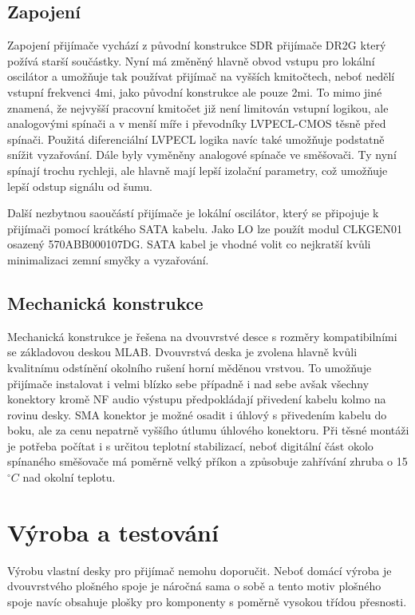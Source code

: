 \documentclass[12pt,a4paper,oneside]{article}
\begin{document}
\subsection{Zapojení}
Zapojení přijímače vychází z původní konstrukce SDR přijímače DR2G \cite{DR2G}  který požívá starší součástky. Nyní má změněný hlavně obvod vstupu pro lokální oscilátor a umožňuje tak používat přijímač na vyšších kmitočtech, neboť nedělí vstupní frekvenci 4mi, jako původní konstrukce ale pouze 2mi. To mimo jiné znamená, že nejvyšší pracovní kmitočet již není limitován vstupní logikou, ale analogovými spínači a v menší míře i převodníky LVPECL-CMOS těsně před spínači. Použitá diferenciální LVPECL logika navíc také umožňuje podstatně snížit vyzařování. Dále byly vyměněny analogové spínače ve směšovači. Ty nyní spínají trochu rychleji, ale hlavně mají lepší izolační parametry, což umožňuje lepší odstup signálu od šumu.


Další nezbytnou saoučástí přijímače je lokální oscilátor, který se připojuje k přijímači pomocí krátkého SATA kabelu. Jako LO lze použít modul CLKGEN01 osazený 570ABB000107DG. SATA kabel je vhodné volit co nejkratší kvůli minimalizaci zemní smyčky a vyzařování. 

\subsection{Mechanická konstrukce}

Mechanická konstrukce je řešena na dvouvrstvé desce s rozměry kompatibilními se základovou deskou MLAB. Dvouvrstvá deska je zvolena hlavně kvůli kvalitnímu odstínění okolního rušení horní měděnou vrstvou. To umožňuje přijímače instalovat i velmi blízko sebe případně i nad sebe avšak všechny konektory  kromě NF audio výstupu předpokládají přivedení kabelu kolmo na rovinu desky. SMA konektor je možné osadit i úhlový s přivedením kabelu do boku, ale za cenu nepatrně vyššího útlumu úhlového konektoru. Při těsné montáži je potřeba počítat i s určitou teplotní stabilizací, neboť digitální část okolo spínaného směšovače má poměrně velký příkon a způsobuje zahřívání zhruba o 15$^\circ C$ nad okolní teplotu. 

\section{Výroba a testování}
Výrobu vlastní desky pro přijímač nemohu doporučit. Neboť domácí výroba je dvouvrstvého plošného spoje je náročná sama o sobě a tento motiv plošného spoje navíc obsahuje plošky pro komponenty s poměrně vysokou třídou přesnosti.
\end{document}
